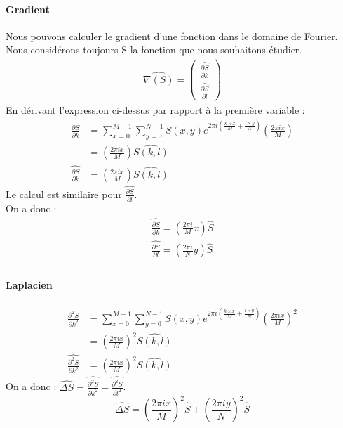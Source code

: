 \paragraph{Gradient}
Nous pouvons calculer le gradient d'une fonction dans le domaine de Fourier. Nous considérons toujours S la fonction que nous souhaitons étudier. 
\begin{equation}
\begin{aligned}
\widehat{\nabla (S)}=
\begin{pmatrix}
\widehat{\frac{\partial S}{\partial k}}\\
\widehat{\frac{\partial S}{\partial l}}
\end{pmatrix}
\end{aligned}
\end{equation}
En dérivant l'expression ci-dessus par rapport à la première variable : 
\begin{equation}
\begin{aligned}
\frac{\partial S}{\partial k} &= \sum_{x = 0}^{M-1} \sum_{y = 0}^{N-1} S(x,y) e^{2\pi i\left(\frac{k\times x}{M}+\frac{l\times y}{N}\right)}\left(\frac{2\pi i x}{M}\right)\\
& = \left(\frac{2\pi i x}{M}\right)\widehat{S(k,l)}\\
\widehat{\frac{\partial S}{\partial k}} &= \left(\frac{2\pi i x}{M}\right)\widehat{S(k,l)}
\end{aligned}
\end{equation}
Le calcul est similaire pour $\widehat{\frac{\partial S}{\partial l}}$.\\
On a donc : 
\begin{equation}
\begin{aligned}
\widehat{\frac{\partial S}{\partial k}} = \left(\frac{2\pi i}{M}x\right) \widehat{S}\\
\widehat{\frac{\partial S}{\partial l}} = \left(\frac{2\pi i}{N}y\right) \widehat{S}\\
\end{aligned}
\end{equation}

\paragraph{Laplacien}
\begin{equation}
\begin{aligned}
\frac{\partial^2 S}{\partial k ^2} & = \sum_{x = 0}^{M-1} \sum_{y = 0}^{N-1} S(x,y) e^{2\pi i\left(\frac{k\times x}{M}+\frac{l\times y}{N}\right)}\left(\frac{2\pi i x}{M}\right)^2\\
& = \left(\frac{2\pi i x}{M}\right)^2 \widehat{S(k,l)}\\
\widehat{\frac{\partial^2 S}{\partial k^2}} &= \left(\frac{2\pi i x}{M}\right)^2\widehat{S(k,l)}
\end{aligned}
\end{equation}
On a donc : 
$\widehat{\Delta S} = \widehat{\frac{\partial^2 S}{\partial k^2}}+ \widehat{\frac{\partial^2 S}{\partial l^2}}$.
\begin{equation}
\widehat{\Delta S} = \left(\frac{2\pi i x}{M}\right)^2 \widehat{S}+\left(\frac{2\pi i y}{N}\right)^2 \widehat{S}
\end{equation}

